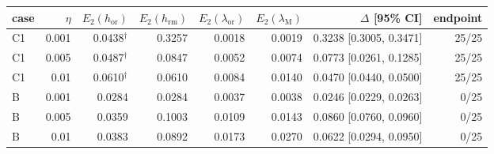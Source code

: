 \begin{tabular}{lrrrrrrr}
\toprule
case & $\eta$ & $E_2(h_{\mathrm{or}})$ & $E_2(h_{\mathrm{rm}})$ & $E_2(\lambda_{\mathrm{or}})$ & $E_2(\lambda_{\mathrm{M}})$ & $\Delta$ [95\% CI] & endpoint \\
\midrule
C1 & 0.001 & 0.0438$^{\dagger}$ & 0.3257 & 0.0018 & 0.0019 & 0.3238 [0.3005, 0.3471] & 25/25 \\
C1 & 0.005 & 0.0487$^{\dagger}$ & 0.0847 & 0.0052 & 0.0074 & 0.0773 [0.0261, 0.1285] & 25/25 \\
C1 & 0.01 & 0.0610$^{\dagger}$ & 0.0610 & 0.0084 & 0.0140 & 0.0470 [0.0440, 0.0500] & 25/25 \\
B & 0.001 & 0.0284 & 0.0284 & 0.0037 & 0.0038 & 0.0246 [0.0229, 0.0263] & 0/25 \\
B & 0.005 & 0.0359 & 0.1003 & 0.0109 & 0.0143 & 0.0860 [0.0760, 0.0960] & 0/25 \\
B & 0.01 & 0.0383 & 0.0892 & 0.0173 & 0.0270 & 0.0622 [0.0294, 0.0950] & 0/25 \\
\bottomrule
\end{tabular}
